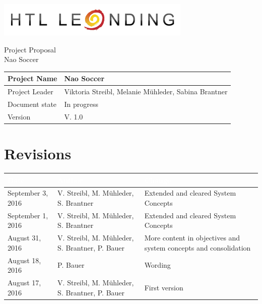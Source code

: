 \documentclass[12pt]{article}
\theoremstyle{definition}
\newcommand{\projectname}{Nao Soccer}
\newcommand{\productname}{Nao Soccer}
\newcommand{\projectleader}{Viktoria Streibl, Melanie Mühleder, Sabina Brantner}
\newcommand{\documentstatus}{In progress}
\newcommand{\version}{V. 1.0}
\begin{document}
\begin{titlepage}
\begin{flushright}
\includegraphics[scale=.5]{htlleondinglogo.png}\\
\end{flushright}

\vspace{10em}

\begin{center}
{\Huge Project Proposal} \\[3em]
{\LARGE \productname} \\[3em]
\end{center}

\begin{flushleft}
\begin{tabular}{|l|l|}
\hline
Project Name & \projectname \\ \hline
Project Leader & \projectleader \\ \hline
Document state & \documentstatus \\ \hline
Version & \version \\ \hline
\end{tabular}
\end{flushleft}

\end{titlepage}
\section*{Revisions}
\begin{tabular}{|p{.25\linewidth}|p{.3\linewidth}|p{.37\linewidth}|}
\hline
\cellcolor[gray]{0.5}\textcolor{white}{Date} & \cellcolor[gray]{0.45}\textcolor{white}{Author} & \cellcolor[gray]{0.5}\textcolor{white}{Change} \\ \hline
September 3, 2016&V. Streibl, M. Mühleder, S. Brantner&Extended and cleared System Concepts \\ \hline
September 1, 2016&V. Streibl, M. Mühleder, S. Brantner&Extended and cleared System Concepts \\ \hline
August 31, 2016&V. Streibl, M. Mühleder, S. Brantner, P. Bauer&More content in objectives and system concepts and consolidation \\ \hline
August 18, 2016&P. Bauer&Wording \\ \hline
August 17, 2016&V. Streibl, M. Mühleder, S. Brantner, P. Bauer&First version \\ \hline
\end{tabular}
\pagebreak
\end{document}
